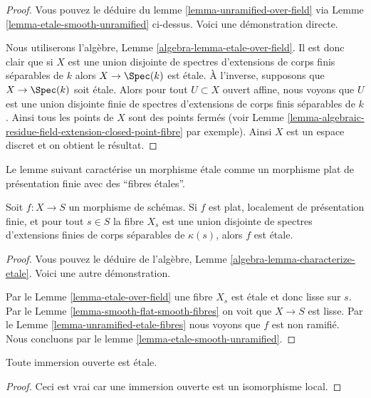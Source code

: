 \begin{proof}
Vous pouvez le déduire du lemme \ref{lemma-unramified-over-field} via Lemme
\ref{lemma-etale-smooth-unramified} ci-dessus. Voici une démonstration
directe.

\medskip\noindent
Nous utiliserons l'algèbre, Lemme \ref{algebra-lemma-etale-over-field}. Il est donc clair que
si $X$ est une union disjointe de spectres d'extensions de corps finis
séparables de $k$ alors $X \to \Spec(k)$ est étale. À
l’inverse, supposons que $X \to \Spec(k)$ soit étale. Alors pour tout $U \subset X$
ouvert affine, nous voyons que $U$ est une union disjointe
finie de spectres d'extensions de corps finis séparables de $k$.
Ainsi tous les points de
$X$ sont des points fermés (voir Lemme \ref{lemma-algebraic-residue-field-extension-closed-point-fibre} par exemple).
Ainsi $X$ est un espace discret et on obtient le résultat.
\end{proof}

\noindent
Le lemme suivant caractérise un morphisme étale comme un morphisme plat
de présentation finie avec des ``fibres étales''.

\begin{lemma}
\label{lemma-etale-flat-etale-fibres}
Soit $f : X \to S$ un morphisme de schémas. Si $f$
est plat, localement de présentation finie, et pour tout $s \in S$ la fibre $X_s$
est une union disjointe de spectres d'extensions finies de corps séparables
de $\kappa(s)$, alors $f$ est étale.
\end{lemma}

\begin{proof}
Vous pouvez le déduire
de l'algèbre, Lemme \ref{algebra-lemma-characterize-etale}. Voici une autre
démonstration.

\medskip\noindent
Par le Lemme \ref{lemma-etale-over-field} une fibre $X_s$ est étale
et donc lisse sur $s$. Par le Lemme \ref{lemma-smooth-flat-smooth-fibres} on
voit que $X \to S$ est lisse.
Par le Lemme \ref{lemma-unramified-etale-fibres} nous voyons
que $f$ est non ramifié. Nous
concluons par le lemme \ref{lemma-etale-smooth-unramified}.
\end{proof}

\begin{lemma}
\label{lemma-open-immersion-etale}
Toute immersion ouverte est étale.
\end{lemma}

\begin{proof}
Ceci est vrai car une immersion ouverte est un isomorphisme local.
\end{proof}

